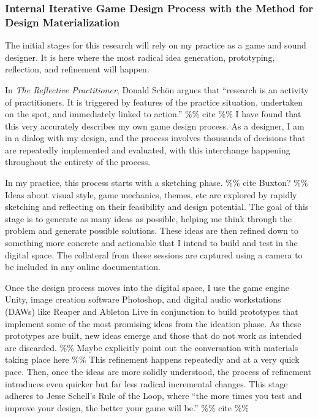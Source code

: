 \documentclass[
]{article}
\begin{document}
\subsubsection{Internal Iterative Game Design Process with the Method
for Design
Materialization}\label{internal-iterative-game-design-process-with-the-method-for-design-materialization}

The initial stages for this research will rely on my practice as a game
and sound designer. It is here where the most radical idea generation,
prototyping, reflection, and refinement will happen.

In \emph{The Reflective Practitioner}, Donald Schön argues that
``research is an activity of practitioners. It is triggered by features
of the practice situation, undertaken on the spot, and immediately
linked to action.'' \%\% cite \%\% I have found that this very
accurately describes my own game design process. As a designer, I am in
a dialog with my design, and the process involves thousands of decisions
that are repeatedly implemented and evaluated, with this interchange
happening throughout the entirety of the process.

In my practice, this process starts with a sketching phase. \%\% cite
Buxton? \%\% Ideas about visual style, game mechanics, themes, etc are
explored by rapidly sketching and reflecting on their feasibility and
design potential. The goal of this stage is to generate as many ideas as
possible, helping me think through the problem and generate possible
solutions. These ideas are then refined down to something more concrete
and actionable that I intend to build and test in the digital space. The
collateral from these sessions are captured using a camera to be
included in any online documentation.

Once the design process moves into the digital space, I use the game
engine Unity, image creation software Photoshop, and digital audio
workstations (DAWs) like Reaper and Ableton Live in conjunction to build
prototypes that implement some of the most promising ideas from the
ideation phase. As these prototypes are built, new ideas emerge and
those that do not work as intended are discarded. \%\% Maybe explicitly
point out the conversation with materials taking place here \%\% This
refinement happens repeatedly and at a very quick pace. Then, once the
ideas are more solidly understood, the process of refinement introduces
even quicker but far less radical incremental changes. This stage
adheres to Jesse Schell's Rule of the Loop, where ``the more times you
test and improve your design, the better your game will be.'' \%\% cite
\%\%
\end{document}
